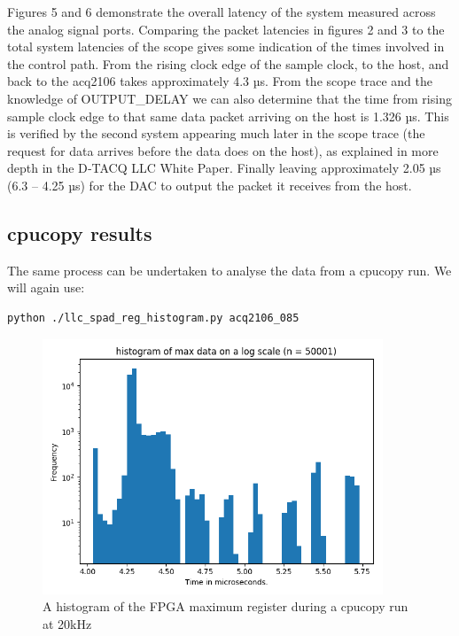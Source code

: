 \documentclass{article}
\begin{document}
Figures 5 and 6 demonstrate the overall latency of the system measured across the analog signal ports.
Comparing the packet latencies in figures 2 and 3 to the total system latencies of the scope gives some indication of the times involved in the control path.
From the rising clock edge of the sample clock, to the host, and back to the acq2106 takes approximately 4.3 µs.
From the scope trace and the knowledge of OUTPUT\_DELAY we can also determine that the time from rising sample clock edge to that same data packet arriving on the host is 1.326 µs.
This is verified by the second system appearing much later in the scope trace (the request for data arrives before the data does on the host), as explained in more depth in the D‑TACQ  LLC White Paper.
Finally leaving approximately 2.05 µs (6.3 – 4.25 µs)  for the DAC to output the packet it receives from the host.

\subsection{cpucopy results}
The same process can be undertaken to analyse the data from a cpucopy run. We will again use:

\begin{verbatim}
python ./llc_spad_reg_histogram.py acq2106_085
\end{verbatim}

\begin{figure}
	\centering
	\includegraphics[width=4.0in]{images/cpu_copy_20kHz.png}
	\caption{A histogram of the FPGA maximum register during a cpucopy run at 20kHz}
	\label{cpu20hist}
\end{figure}
\end{document}
